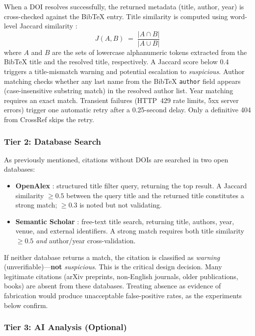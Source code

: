 When a DOI resolves successfully, the returned metadata (title, author, year) is cross-checked against the BibTeX entry. Title similarity is computed using word-level Jaccard similarity \citep{jaccard1912}:
%
\begin{equation}
  J(A, B) \;=\; \frac{|A \cap B|}{|A \cup B|}
\end{equation}
%
where $A$ and $B$ are the sets of lowercase alphanumeric tokens extracted from the BibTeX title and the resolved title, respectively. A Jaccard score below 0.4 triggers a title-mismatch warning and potential escalation to \textit{suspicious}. Author matching checks whether any last name from the BibTeX \texttt{author} field appears (case-insensitive substring match) in the resolved author list. Year matching requires an exact match. Transient failures (HTTP~429 rate limits, 5xx server errors) trigger one automatic retry after a 0.25-second delay. Only a definitive 404 from CrossRef skips the retry.

\subsubsection{Tier 2: Database Search}

As previously mentioned, citations without DOIs are searched in two open databases:

\begin{itemize}
  \item \textbf{OpenAlex} \citep{openalex2026}: structured title filter query, returning the top result. A Jaccard similarity $\geq 0.5$ between the query title and the returned title constitutes a strong match; $\geq 0.3$ is noted but not validating.
  \item \textbf{Semantic Scholar} \citep{semanticscholar2026}: free-text title search, returning title, authors, year, venue, and external identifiers. A strong match requires both title similarity $\geq 0.5$ \emph{and} author/year cross-validation.
\end{itemize}

If neither database returns a match, the citation is classified as \textit{warning} (unverifiable)---\textbf{not} \textit{suspicious}. This is the critical design decision. Many legitimate citations (arXiv preprints, non-English journals, older publications, books) are absent from these databases. Treating absence as evidence of fabrication would produce unacceptable false-positive rates, as the experiments below confirm.

\subsubsection{Tier 3: AI Analysis (Optional)}

